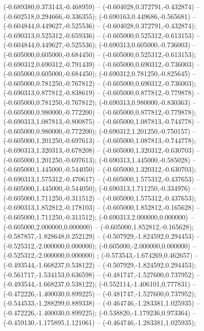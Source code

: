  (-0.689380,0.373143,-0.468959) -- (-0.604028,0.372791,-0.432874) -- (-0.602518,0.294666,-0.336355);
 (-0.690163,0.449686,-0.565681) -- (-0.604844,0.449627,-0.525536) -- (-0.604028,0.372791,-0.432874);
 (-0.690313,0.525312,-0.659336) -- (-0.605000,0.525312,-0.613153) -- (-0.604844,0.449627,-0.525536);
 (-0.690313,0.605000,-0.736003) -- (-0.605000,0.605000,-0.684450) -- (-0.605000,0.525312,-0.613153);
 (-0.690312,0.690312,-0.791439) -- (-0.605000,0.690312,-0.736003) -- (-0.605000,0.605000,-0.684450);
 (-0.690312,0.781250,-0.825645) -- (-0.605000,0.781250,-0.767812) -- (-0.605000,0.690312,-0.736003);
 (-0.690313,0.877812,-0.838619) -- (-0.605000,0.877812,-0.779878) -- (-0.605000,0.781250,-0.767812);
 (-0.690313,0.980000,-0.830363) -- (-0.605000,0.980000,-0.772200) -- (-0.605000,0.877812,-0.779878);
 (-0.690313,1.087813,-0.800875) -- (-0.605000,1.087813,-0.744778) -- (-0.605000,0.980000,-0.772200);
 (-0.690312,1.201250,-0.750157) -- (-0.605000,1.201250,-0.697613) -- (-0.605000,1.087813,-0.744778);
 (-0.690313,1.320313,-0.678208) -- (-0.605000,1.320312,-0.630703) -- (-0.605000,1.201250,-0.697613);
 (-0.690313,1.445000,-0.585028) -- (-0.605000,1.445000,-0.544050) -- (-0.605000,1.320312,-0.630703);
 (-0.690313,1.575312,-0.470617) -- (-0.605000,1.575312,-0.437653) -- (-0.605000,1.445000,-0.544050);
 (-0.690313,1.711250,-0.334976) -- (-0.605000,1.711250,-0.311512) -- (-0.605000,1.575312,-0.437653);
 (-0.690313,1.852812,-0.178103) -- (-0.605000,1.852812,-0.165628) -- (-0.605000,1.711250,-0.311512);
 (-0.690313,2.000000,0.000000) -- (-0.605000,2.000000,0.000000) -- (-0.605000,1.852812,-0.165628);
 (-0.587857,-1.828648,0.252129) -- (-0.507929,-1.824592,0.294453) -- (-0.525312,-2.000000,0.000000);
 (-0.605000,-2.000000,0.000000) -- (-0.525312,-2.000000,0.000000) ;
 (-0.573543,-1.674269,0.462657) -- (-0.493544,-1.668237,0.538122) -- (-0.507929,-1.824592,0.294453);
 (-0.561717,-1.534153,0.636598) -- (-0.481747,-1.527600,0.737952) -- (-0.493544,-1.668237,0.538122);
 (-0.552114,-1.406101,0.777831) -- (-0.472226,-1.400030,0.899225) -- (-0.481747,-1.527600,0.737952);
 (-0.544533,-1.288299,0.889338) -- (-0.464746,-1.283381,1.025935) -- (-0.472226,-1.400030,0.899225);
 (-0.538820,-1.179236,0.973364) -- (-0.459130,-1.175895,1.121061) -- (-0.464746,-1.283381,1.025935);
